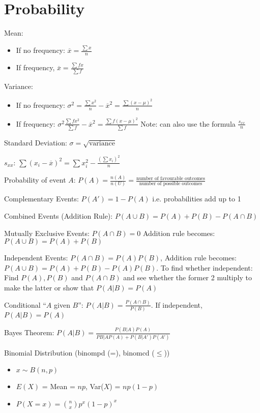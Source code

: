 \documentclass[10pt,a4paper,oneside]{book}
\begin{document}
\section*{Probability}
Mean:
\begin{itemize}
    \item If no frequency: $\overline{x}=\frac{\sum x}{n}$
    \item If frequency, $\overline{x}=\frac{\sum fx}{\sum f}$
\end{itemize}

Variance:
\begin{itemize}
    \item If no frequency: $\sigma^2 = \frac{\sum x^2}{n}-\overline{x}^2=\frac{\sum(x-\mu)^2}{n}$
    \item If frequency: $\sigma^2 \frac{\sum fx^2}{\sum f}-\overline{x}^2=\frac{\sum f(x-\mu)^2}{\sum f}$
    Note: can also use the formula $\frac{s_{xx}}{n}$
\end{itemize}

Standard Deviation: $\sigma=\sqrt{\text{variance}}$

$s_{xx}$: $\sum (x_i-\overline{x})^2=\sum x_i^2-\frac{(\sum x_i)^2}{n}$

Probability of event $A$: $P(A)=\frac{n(A)}{n(U)}=\frac{\text{number of favourable outcomes}}{\text{number of possible outcomes}}$

Complementary Events: $P(A')=1-P(A)$ i.e. probabilities add up to 1

Combined Events (Addition Rule): $P(A\cup B)=P(A)+P(B)-P(A\cap B)$

Mutually Exclusive Events: $P(A\cap B)=0$ Addition rule becomes: $P(A\cup B)=P(A)+P(B)$

Independent Events: $P(A\cap B)=P(A)P(B)$, Addition rule becomes: $P(A\cup B)=P(A)+P(B)-P(A)P(B)$. To find whether independent: Find $P(A), P(B)$ and $P(A\cap B)$ and see whether the former 2 multiply to make the latter or show that $P(A|B)=P(A)$

Conditional ``$A$ given $B$'': $P(A|B)=\frac{P(A\cap B)}{P(B)}$. If independent, $P(A|B)=P(A)$

Bayes Theorem: $P(A|B)=\frac{P(B|A)P(A)}{P{B|A}P(A)+P(B|A')P(A')}$

Binomial Distribution (binompd (=), binomcd ($\leq$))
\begin{itemize}
    \item $x \sim B(n,p)$
    \item $E(X)$ = Mean = $np$, Var($X$) = $np(1-p)$
    \item $P(X=x)=\binom{n}{x}p^x(1-p)^x$
\end{itemize}
\end{document}
